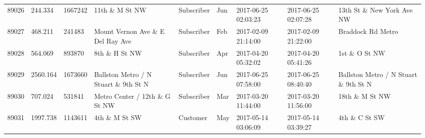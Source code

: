 \documentclass[11pt]{article}
\begin{document}
\begin{tabular}{r|llllllll}
	89026 &  244.334                                           & 1667242                                            & 11th \& M St NW                                   & Subscriber                                         & Jun                                                & 2017-06-25 02:03:23                                & 2017-06-25 02:07:28                                & 13th St \& New York Ave NW                       \\
	89027 &  468.211                                           &  241483                                            & Mount Vernon Ave \& E Del Ray Ave                 & Subscriber                                         & Feb                                                & 2017-02-09 21:14:00                                & 2017-02-09 21:22:00                                & Braddock Rd Metro                                 \\
	89028 &  564.069                                           &  893870                                            & 8th \& H St NW                                    & Subscriber                                         & Apr                                                & 2017-04-20 05:32:02                                & 2017-04-20 05:41:26                                & 1st \& O St NW                                   \\
	89029 & 2560.164                                           & 1673660                                            & Ballston Metro / N Stuart \& 9th St N             & Subscriber                                         & Jun                                                & 2017-06-25 07:58:00                                & 2017-06-25 08:40:40                                & Ballston Metro / N Stuart \& 9th St N            \\
	89030 &  707.024                                           &  531841                                            & Metro Center / 12th \& G St NW                    & Subscriber                                         & Mar                                                & 2017-03-20 11:44:00                                & 2017-03-20 11:56:00                                & 18th \& M St NW                                  \\
	89031 & 1997.738                                           & 1143611                                            & 4th \& M St SW                                    & Customer                                           & May                                                & 2017-05-14 03:06:09                                & 2017-05-14 03:39:27                                & 4th \& C St SW                                   \\

\end{tabular}
\end{document}
